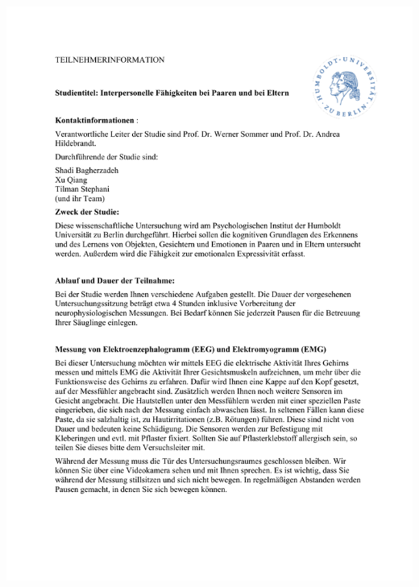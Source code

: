 \begin{center}
\includegraphics[page=3,scale=0.9,trim={70 0 0 110},clip]{"Appendix/consent_form_and_info_sheet"}
\newpage

\end{center}
